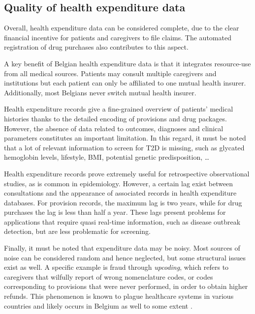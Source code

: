 \subsection{Quality of health expenditure data}
Overall, health expenditure data can be considered complete, due to the clear financial incentive for patients and caregivers to file claims. The automated registration of drug purchases also contributes to this aspect.

A key benefit of Belgian health expenditure data is that it integrates resource-use from all medical sources. Patients may consult multiple caregivers and institutions but each patient can only be affiliated to one mutual health insurer. Additionally, most Belgians never switch mutual health insurer.

Health expenditure records give a fine-grained overview of patients' medical histories thanks to the detailed encoding of provisions and drug packages. However, the absence of data related to outcomes, diagnoses and clinical parameters constitutes an important limitation. In this regard, it must be noted that a lot of relevant information to screen for T2D is missing, such as glycated hemoglobin levels, lifestyle, BMI, potential genetic predisposition, \ldots

Health expenditure records prove extremely useful for retrospective observational studies, as is common in epidemiology. However, a certain lag exist between consultations and the appearance of associated records in health expenditure databases. For provision records, the maximum lag is two years, while for drug purchases the lag is less than half a year. These lags present problems for applications that require quasi real-time information, such as disease outbreak detection, but are less problematic for screening.

Finally, it must be noted that expenditure data may be noisy. Most sources of noise can be considered random and hence neglected, but some structural issues exist as well. A specific example is fraud through \emph{upcoding}, which refers to caregivers that wilfully report of wrong nomenclature codes, or codes corresponding to provisions that were never performed, in order to obtain higher refunds. This phenomenon is known to plague healthcare systems in various countries and likely occurs in Belgium as well to some extent \citep{silverman2004medicare,steinbusch2007risk,berta2010effects}.
